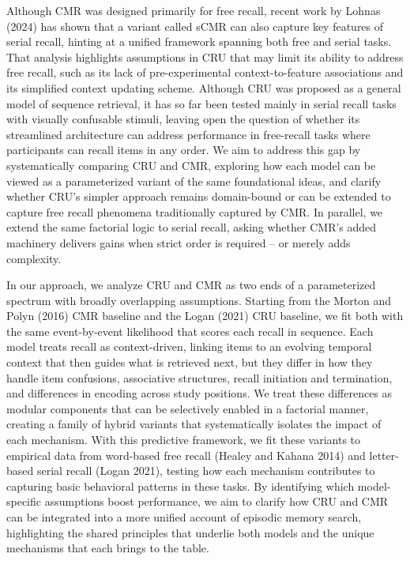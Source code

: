 \documentclass[
  letterpaper,
  DIV=11,
  numbers=noendperiod]{scrartcl}
\begin{document}
Although CMR was designed primarily for free recall, recent work by
Lohnas (2024) has shown that a variant called sCMR can also capture key
features of serial recall, hinting at a unified framework spanning both
free and serial tasks. That analysis highlights assumptions in CRU that
may limit its ability to address free recall, such as its lack of
pre-experimental context-to-feature associations and its simplified
context updating scheme. Although CRU was proposed as a general model of
sequence retrieval, it has so far been tested mainly in serial recall
tasks with visually confusable stimuli, leaving open the question of
whether its streamlined architecture can address performance in
free-recall tasks where participants can recall items in any order. We
aim to address this gap by systematically comparing CRU and CMR,
exploring how each model can be viewed as a parameterized variant of the
same foundational ideas, and clarify whether CRU's simpler approach
remains domain-bound or can be extended to capture free recall phenomena
traditionally captured by CMR. In parallel, we extend the same factorial
logic to serial recall, asking whether CMR's added machinery delivers
gains when strict order is required -- or merely adds complexity.

In our approach, we analyze CRU and CMR as two ends of a parameterized
spectrum with broadly overlapping assumptions. Starting from the Morton
and Polyn (2016) CMR baseline and the Logan (2021) CRU baseline, we fit
both with the same event-by-event likelihood that scores each recall in
sequence. Each model treats recall as context-driven, linking items to
an evolving temporal context that then guides what is retrieved next,
but they differ in how they handle item confusions, associative
structures, recall initiation and termination, and differences in
encoding across study positions. We treat these differences as modular
components that can be selectively enabled in a factorial manner,
creating a family of hybrid variants that systematically isolates the
impact of each mechanism. With this predictive framework, we fit these
variants to empirical data from word-based free recall (Healey and
Kahana 2014) and letter-based serial recall (Logan 2021), testing how
each mechanism contributes to capturing basic behavioral patterns in
these tasks. By identifying which model-specific assumptions boost
performance, we aim to clarify how CRU and CMR can be integrated into a
more unified account of episodic memory search, highlighting the shared
principles that underlie both models and the unique mechanisms that each
brings to the table.
\end{document}
